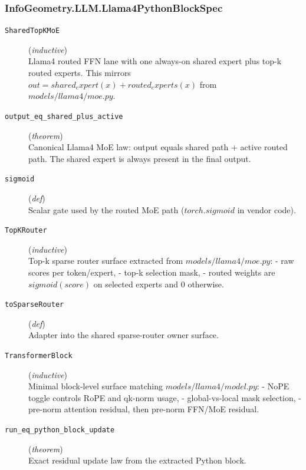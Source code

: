 \documentclass[11pt,a4paper]{article}
\begin{document}
\subsubsection*{InfoGeometry.LLM.Llama4PythonBlockSpec}
\begin{description}
  \item[\texttt{SharedTopKMoE}] (\textit{inductive}) \\ Llama4 routed FFN lane with one always-on shared expert plus top-k routed experts. 
This mirrors $out = shared_expert(x) + routed_experts(x)$ from $models/llama4/moe.py$.
  \item[\texttt{output\_eq\_shared\_plus\_active}] (\textit{theorem}) \\ Canonical Llama4 MoE law: output equals shared path + active routed path. 
The shared expert is always present in the final output.
  \item[\texttt{sigmoid}] (\textit{def}) \\ Scalar gate used by the routed MoE path ($torch.sigmoid$ in vendor code).
  \item[\texttt{TopKRouter}] (\textit{inductive}) \\ Top-k sparse router surface extracted from $models/llama4/moe.py$: 
- raw scores per token/expert, 
- top-k selection mask, 
- routed weights are $sigmoid(score)$ on selected experts and $0$ otherwise.
  \item[\texttt{toSparseRouter}] (\textit{def}) \\ Adapter into the shared sparse-router owner surface.
  \item[\texttt{TransformerBlock}] (\textit{inductive}) \\ Minimal block-level surface matching $models/llama4/model.py$: 
- NoPE toggle controls RoPE and qk-norm usage, 
- global-vs-local mask selection, 
- pre-norm attention residual, then pre-norm FFN/MoE residual.
  \item[\texttt{run\_eq\_python\_block\_update}] (\textit{theorem}) \\ Exact residual update law from the extracted Python block.
\end{description}
\end{document}
